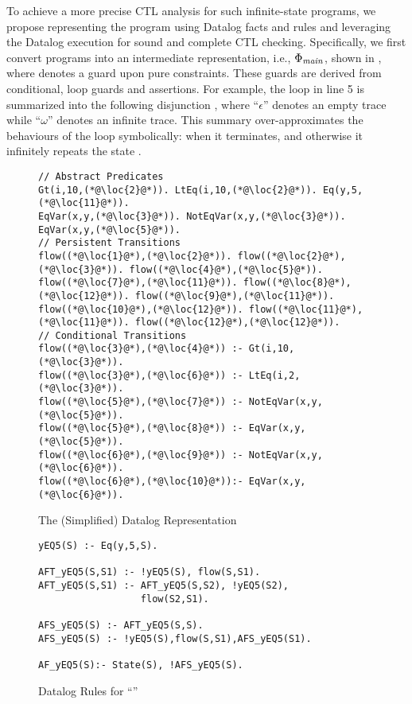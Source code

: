 To achieve a more precise CTL analysis for such infinite-state programs, we propose representing the program using Datalog facts and rules and leveraging the Datalog execution for sound and complete CTL checking. 
Specifically, we first convert programs into an intermediate representation, i.e., $\Phi_{\mathit{main}}$,  shown in , where \code{[\pi]} denotes a guard upon pure constraints. These guards are derived from conditional, loop guards and assertions. For example, the loop in line 5 is summarized into the following disjunction , where ``$\epsilon$'' denotes an empty trace while ``$\omega$'' denotes an infinite trace.  
This summary over-approximates the behaviours of the loop symbolically: when  it terminates, and otherwise it infinitely repeats the state . 




\begin{figure}[!b]
\vspace{-3mm}
\begin{lstlisting}[xleftmargin=1em,numbers=none,basicstyle=\footnotesize\ttfamily]
// Abstract Predicates 
Gt(i,10,(*@\loc{2}@*)). LtEq(i,10,(*@\loc{2}@*)). Eq(y,5,(*@\loc{11}@*)). 
EqVar(x,y,(*@\loc{3}@*)). NotEqVar(x,y,(*@\loc{3}@*)). EqVar(x,y,(*@\loc{5}@*)).
// Persistent Transitions
flow((*@\loc{1}@*),(*@\loc{2}@*)). flow((*@\loc{2}@*),(*@\loc{3}@*)). flow((*@\loc{4}@*),(*@\loc{5}@*)). 
flow((*@\loc{7}@*),(*@\loc{11}@*)). flow((*@\loc{8}@*),(*@\loc{12}@*)). flow((*@\loc{9}@*),(*@\loc{11}@*)). 
flow((*@\loc{10}@*),(*@\loc{12}@*)). flow((*@\loc{11}@*),(*@\loc{11}@*)). flow((*@\loc{12}@*),(*@\loc{12}@*)). 
// Conditional Transitions
flow((*@\loc{3}@*),(*@\loc{4}@*)) :- Gt(i,10,(*@\loc{3}@*)).
flow((*@\loc{3}@*),(*@\loc{6}@*)) :- LtEq(i,2,(*@\loc{3}@*)).
flow((*@\loc{5}@*),(*@\loc{7}@*)) :- NotEqVar(x,y,(*@\loc{5}@*)).
flow((*@\loc{5}@*),(*@\loc{8}@*)) :- EqVar(x,y,(*@\loc{5}@*)).
flow((*@\loc{6}@*),(*@\loc{9}@*)) :- NotEqVar(x,y,(*@\loc{6}@*)).
flow((*@\loc{6}@*),(*@\loc{10}@*)):- EqVar(x,y,(*@\loc{6}@*)).
\end{lstlisting}
\caption{The (Simplified) Datalog Representation}
\label{fig:Datalog_first_Example}
\end{figure}

\begin{figure}[!b]
\begin{lstlisting}[xleftmargin=1em,numbers=none,basicstyle=\footnotesize\ttfamily]
yEQ5(S) :- Eq(y,5,S).

AFT_yEQ5(S,S1) :- !yEQ5(S), flow(S,S1). 
AFT_yEQ5(S,S1) :- AFT_yEQ5(S,S2), !yEQ5(S2), 
                  flow(S2,S1).
                   
AFS_yEQ5(S) :- AFT_yEQ5(S,S).
AFS_yEQ5(S) :- !yEQ5(S),flow(S,S1),AFS_yEQ5(S1).
               
AF_yEQ5(S):- State(S), !AFS_yEQ5(S).
\end{lstlisting} 
\caption{Datalog Rules for ``''}
\label{fig:first_Example_ctl_rules}
\end{figure}

